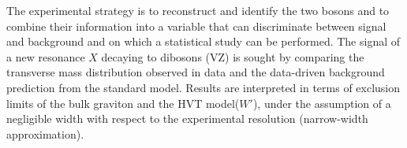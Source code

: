 The experimental strategy is to reconstruct and identify the two bosons and to combine
their information into a variable that can discriminate between signal and background and on which a statistical study can be performed. The signal of a new resonance $X$ decaying to dibosons (VZ) is sought by comparing the transverse mass distribution observed in data and the data-driven background prediction from the standard model. Results are interpreted in terms of exclusion limits of the bulk graviton and the HVT model($W'$), under the assumption of a negligible width with respect to the experimental resolution (narrow-width approximation).









